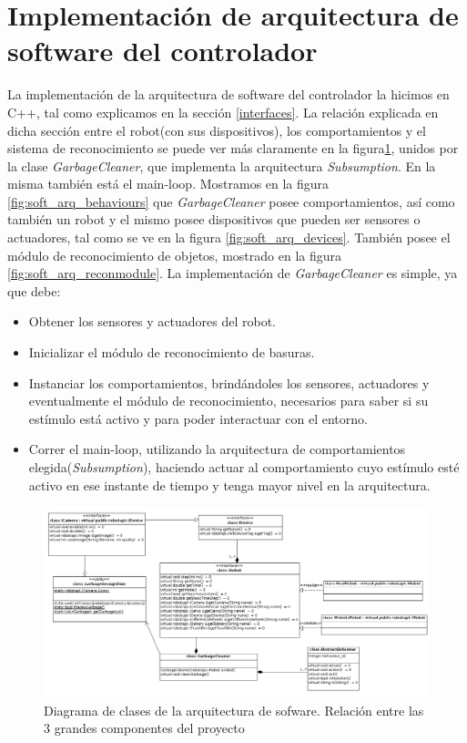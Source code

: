 
\section[Implementaci\'on de arquitectura de software del controlador]
		{Implementaci\'on de arquitectura de software del controlador}
La implementaci\'on de la arquitectura de software del controlador la hicimos en C++, tal
como explicamos en la secci\'on \ref{interfaces}. La relaci\'on explicada en dicha secci\'on
entre el robot(con sus dispositivos), los comportamientos y el sistema de reconocimiento se
puede ver m\'as claramente en la figura\ref{fig:theAllTogether}, unidos por la clase \textit{GarbageCleaner},
que implementa la arquitectura \emph{Subsumption}. En la misma tambi\'en est\'a el main-loop. Mostramos
en la figura \ref{fig:soft_arq_behaviours} que \textit{GarbageCleaner} posee comportamientos, as\'i como tambi\'en
un robot y el mismo posee dispositivos que pueden ser sensores o actuadores, tal como se ve
en la figura \ref{fig:soft_arq_devices}. Tambi\'en posee el m\'odulo de reconocimiento de
objetos, mostrado en la figura \ref{fig:soft_arq_reconmodule}. La implementaci\'on de \textit{GarbageCleaner}
es simple, ya que debe:
\begin{itemize}
	\item{} Obtener los sensores y actuadores del robot.
	\item{} Inicializar el m\'odulo de reconocimiento de basuras.
	\item{} Instanciar los comportamientos, brind\'andoles los sensores, actuadores y eventualmente
			el m\'odulo de reconocimiento, necesarios para saber si su est\'imulo est\'a activo y
			para poder interactuar con el entorno.
	\item{} Correr el main-loop, utilizando la arquitectura de comportamientos
			elegida(\emph{Subsumption}), haciendo actuar al comportamiento cuyo est\'imulo
			est\'e activo en ese instante de tiempo y tenga mayor nivel en la arquitectura.
\end{itemize}
\begin{landscape}
\begin{figure}[h]
	\centering
	\includegraphics[scale=0.52]{comportamientos/figures/api4.png}
	\caption[Arquitectura de software: principales componentes]{Diagrama de clases de la arquitectura
			de sofware. Relaci\'on entre las 3 grandes componentes del proyecto}
	\label{fig:theAllTogether}
\end{figure}
\end{landscape}


